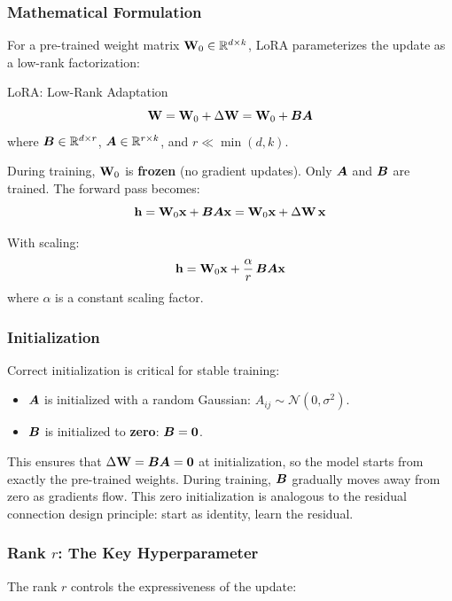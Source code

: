 \subsubsection{Mathematical Formulation}

For a pre-trained weight matrix $\mathbf{W}_0 \in \mathbb{R}^{d \times k}$, LoRA
parameterizes the update as a low-rank factorization:

\begin{mathresult}{LoRA: Low-Rank Adaptation}
\[
    \mathbf{W} = \mathbf{W}_0 + \Delta\mathbf{W} = \mathbf{W}_0 + \bm{B}\bm{A}
\]
where $\bm{B} \in \mathbb{R}^{d \times r}$, $\bm{A} \in \mathbb{R}^{r \times k}$, and $r \ll \min(d, k)$.

During training, $\mathbf{W}_0$ is \textbf{frozen} (no gradient updates).
Only $\bm{A}$ and $\bm{B}$ are trained.  The forward pass becomes:
\[
    \mathbf{h} = \mathbf{W}_0 \mathbf{x} + \bm{B}\bm{A}\mathbf{x} = \mathbf{W}_0 \mathbf{x} + \Delta\mathbf{W}\,\mathbf{x}
\]

With scaling:
\[
    \mathbf{h} = \mathbf{W}_0 \mathbf{x} + \frac{\alpha}{r}\,\bm{B}\bm{A}\mathbf{x}
\]
where $\alpha$ is a constant scaling factor.
\end{mathresult}

\subsubsection{Initialization}

Correct initialization is critical for stable training:
\begin{itemize}
    \item $\bm{A}$ is initialized with a random Gaussian: $A_{ij} \sim \mathcal{N}(0, \sigma^2)$.
    \item $\bm{B}$ is initialized to \textbf{zero}: $\bm{B} = \mathbf{0}$.
\end{itemize}
This ensures that $\Delta\mathbf{W} = \bm{B}\bm{A} = \mathbf{0}$ at initialization, so the
model starts from exactly the pre-trained weights.  During training, $\bm{B}$
gradually moves away from zero as gradients flow.  This zero initialization is
analogous to the residual connection design principle: start as identity, learn
the residual.

\subsubsection{Rank $r$: The Key Hyperparameter}

The rank $r$ controls the expressiveness of the update:

